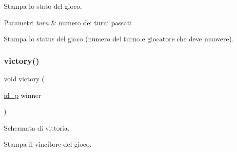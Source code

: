 Stampa lo stato del gioco. 


\begin{DoxyParams}{Parametri}
{\em turn} & numero dei turni passati\\
\hline
\end{DoxyParams}
Stampa lo status del gioco (numero del turno e giocatore che deve muovere). \mbox{\label{group__Output_ga126ef35a3cacdc550c03a737bf1311bf}} 
\subsubsection{\texorpdfstring{victory()}{victory()}}
{\footnotesize\ttfamily void victory (\begin{DoxyParamCaption}\item[{\hyperlink{ml__lib_8h_a0330ff92cbc796e96c3ce3e4401bf1e1}{id\+\_\+p}}]{winner }\end{DoxyParamCaption})}



Schermata di vittoria. 

Stampa il vincitore del gioco. 
